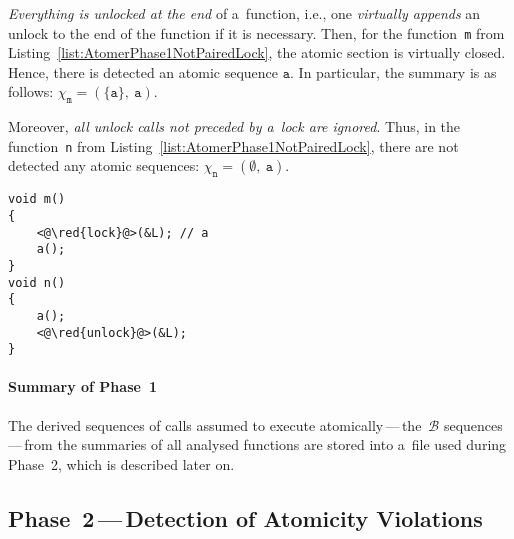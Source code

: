 \emph{Everything is unlocked at the end} of a~function, i.e., one \emph{virtually appends} an unlock to the end of the function if it is necessary. Then, for the function~\texttt{m} from Listing~\ref{list:AtomerPhase1NotPairedLock}, the atomic section is virtually closed. Hence, there is detected an atomic sequence $ \mathtt{a} $. In particular, the summary is as follows: $ \chi_\mathtt{m} = (\{\mathtt{a}\},\ \mathtt{a}) $.

Moreover, \emph{all unlock calls not preceded by a~lock are ignored}. Thus, in the function~\texttt{n} from Listing~\ref{list:AtomerPhase1NotPairedLock}, there are not detected any atomic sequences: $ \chi_\mathtt{n} = (\emptyset,\ \mathtt{a}) $.

\begin{lstlisting}[style=c, label={list:AtomerPhase1NotPairedLock}, float=hbt, caption={A~code snippet used to illustrate treating cases where \emph{lock/unlock calls are not paired} in a~function}]
void m()
{
    <@\red{lock}@>(&L); // a
    a();
}
void n()
{
    a();
    <@\red{unlock}@>(&L);
}
\end{lstlisting}

\paragraph{Summary of Phase~1}
The derived sequences of calls assumed to execute atomically\,---\,the~$ \mathcal{B} $ sequences\,---\,from the summaries of all analysed functions are stored into a~file used during Phase~2, which is described later on.

\subsection{Phase~2\,---\,Detection of Atomicity Violations}


